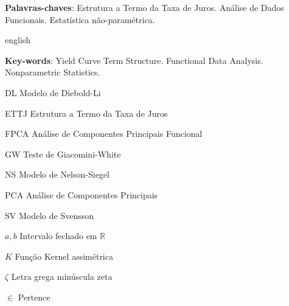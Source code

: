 \documentclass[
	12pt,				%
	openright,			%
	oneside,			%
	a4paper,			%
	english,			%
	brazil				%
	]{dissertacao-ufrgs-abntex2}
\begin{document}

\setlength{\absparsep}{18pt} %
\begin{resumo}
 
 
 \textbf{Palavras-chaves}: Estrutura a Termo da Taxa de Juros. Análise de Dados Funcionais. Estatística não-paramétrica.
\end{resumo}

\begin{resumo}[Abstract]
 \begin{otherlanguage*}{english}

   \vspace{\onelineskip}
 
   \noindent 
   \textbf{Key-words}: Yield Curve Term Structure. Functional Data Analysis. Nonparametric Statistics.
 \end{otherlanguage*}
\end{resumo}



\begin{siglas}
  \item[DL] Modelo de Diebold-Li
  \item[ETTJ] Estrutura a Termo da Taxa de Juros
  \item[FPCA] Análise de Componentes Principais Funcional
  \item[GW] Teste de Giacomini-White
  \item[NS] Modelo de Nelson-Siegel
  \item[PCA] Análise de Componentes Principais
  \item[SV] Modelo de Svensson
\end{siglas}

\begin{simbolos}
  \item[$ a,b $] Intervalo fechado em $\mathbb{R}$
  \item[$ K $] Função Kernel assimétrica
  \item[$ \zeta $] Letra grega minúscula zeta
  \item[$ \in $] Pertence
\end{simbolos}
\end{document}
